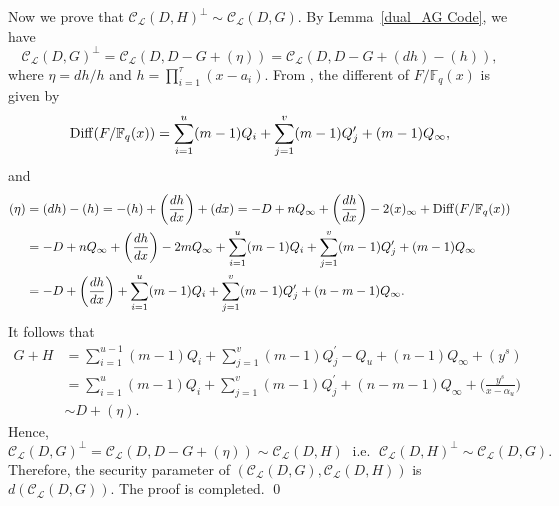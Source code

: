 \documentclass[journal,12pt,onecolumn]{IEEEtran}
\begin{document}
    Now we prove that $\mathcal{C}_{\mathcal{L}}(D,H)^{\bot}\sim \mathcal{C}_{\mathcal{L}}(D,G)$. By Lemma~\ref{dual_AG Code}, we have
    \[
        \mathcal{C}_{\mathcal{L}}(D,G)^{\bot}=\mathcal{C}_{\mathcal{L}}(D,D-G+(\eta))=\mathcal{C}_{\mathcal{L}}(D,D-G+(dh)-(h)),
    \]
    where $\eta = dh/h$ and $h=\prod_{i=1}^\tau(x-a_i)$. From \cite[Chap. 3 and 4]{Algebraic_Function_Fields_and_Codes}, the different of $F/\mathbb{F}_q(x)$ is given by
    \[
        {\rm Diff}(F/\mathbb{F}_q(x)) = \sum_{i=1}^u(m-1)Q_i+\sum_{j=1}^v(m-1)Q_j^\prime+(m-1)Q_\infty,
    \]
    and
    \begin{align*}
        (\eta) &= (dh) - (h) =  - (h) + \bigg(\frac{dh}{dx}\bigg) + (dx)=  - D + n Q_\infty  + \bigg(\frac{dh}{dx}\bigg) -2(x)_\infty + {\rm Diff}(F/\mathbb{F}_q(x))\\
        & =  - D + n Q_\infty  + \bigg(\frac{dh}{dx}\bigg) - 2m Q_\infty +\sum_{i=1}^u(m-1)Q_i+\sum_{j=1}^v(m-1)Q_j^\prime+(m-1)Q_\infty\\
        & = - D + \bigg(\frac{dh}{dx}\bigg) + \sum_{i=1}^u(m-1)Q_i+\sum_{j=1}^v(m-1)Q_j^\prime+(n-m-1)Q_\infty.
    \end{align*}
    It follows that
    \begin{align*}
        G+H & = \sum_{i=1}^{u-1}(m-1)Q_i + \sum_{j=1}^v(m-1)Q_j^\prime - Q_u + (n-1)Q_\infty + (y^s)\\
        & =  \sum_{i=1}^{u}(m-1)Q_i + \sum_{j=1}^v(m-1)Q_j^\prime + (n-m-1)Q_\infty + \bigg(\frac{y^s}{x-\alpha_u}\bigg) \\
        & \sim D + (\eta). 
    \end{align*}
    Hence, 
    \[
        \mathcal{C}_{\mathcal{L}}(D,G)^{\bot}=\mathcal{C}_{\mathcal{L}}(D,D-G+(\eta))\sim \mathcal{C}_{\mathcal{L}}(D,H)\;\text{ i.e. }\;\mathcal{C}_{\mathcal{L}}(D,H)^{\bot}\sim \mathcal{C}_{\mathcal{L}}(D,G).
    \]
    Therefore, the security parameter of $(\mathcal{C}_{\mathcal{L}}(D,G),\mathcal{C}_{\mathcal{L}}(D,H))$ is $d(\mathcal{C}_{\mathcal{L}}(D,G))$. The proof is completed.   \qed
\end{document}
